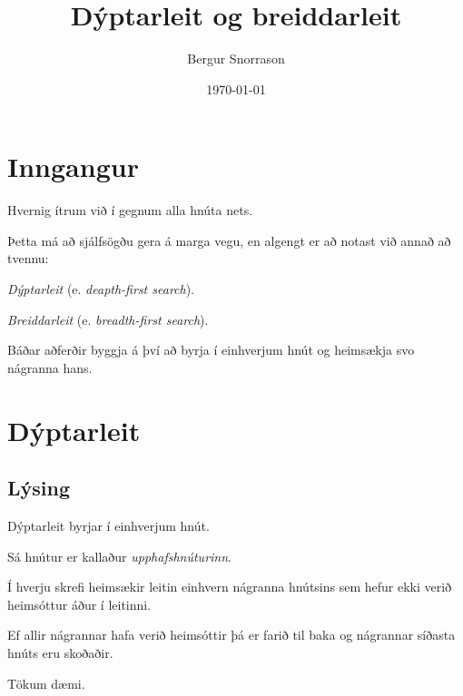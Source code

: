 \title{Dýptarleit og breiddarleit}
\author{Bergur Snorrason}
\date{\today}



\frame{\titlepage}

\section{Inngangur}
{
	{
		\item<1-> Hvernig ítrum við í gegnum alla hnúta nets.
		\item<2-> Þetta má að sjálfsögðu gera á marga vegu, en algengt er að notast við annað að tvennu:
		{
			\item<3-> \emph{Dýptarleit} (e. \emph{deapth-first search}).
			\item<4-> \emph{Breiddarleit} (e. \emph{breadth-first search}).
		}
		\item<5-> Báðar aðferðir byggja á því að byrja í einhverjum hnút og heimsækja svo nágranna hans.
	}
}

\section{Dýptarleit}
\subsection{Lýsing}
{
	{
		\item<1-> Dýptarleit byrjar í einhverjum hnút.
		\item<2-> Sá hnútur er kallaður \emph{upphafshnúturinn}.
		\item<3-> Í hverju skrefi heimsækir leitin einhvern nágranna hnútsins sem hefur ekki verið heimsóttur áður í leitinni.
		\item<4-> Ef allir nágrannar hafa verið heimsóttir þá er farið til baka og nágrannar síðasta hnúts eru skoðaðir.
		\item<5-> Tökum dæmi.
	}
}

